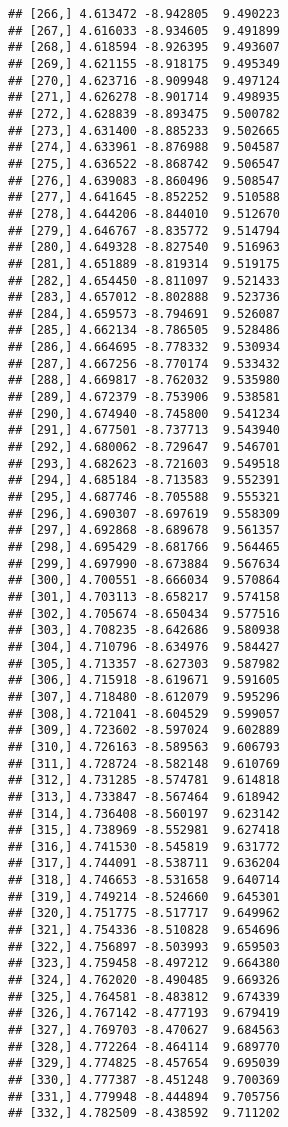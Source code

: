 \documentclass[]{book}
\theoremstyle{definition}
\theoremstyle{definition}
\theoremstyle{definition}
\theoremstyle{remark}
\begin{document}
\begin{verbatim}
## [266,] 4.613472 -8.942805  9.490223
## [267,] 4.616033 -8.934605  9.491899
## [268,] 4.618594 -8.926395  9.493607
## [269,] 4.621155 -8.918175  9.495349
## [270,] 4.623716 -8.909948  9.497124
## [271,] 4.626278 -8.901714  9.498935
## [272,] 4.628839 -8.893475  9.500782
## [273,] 4.631400 -8.885233  9.502665
## [274,] 4.633961 -8.876988  9.504587
## [275,] 4.636522 -8.868742  9.506547
## [276,] 4.639083 -8.860496  9.508547
## [277,] 4.641645 -8.852252  9.510588
## [278,] 4.644206 -8.844010  9.512670
## [279,] 4.646767 -8.835772  9.514794
## [280,] 4.649328 -8.827540  9.516963
## [281,] 4.651889 -8.819314  9.519175
## [282,] 4.654450 -8.811097  9.521433
## [283,] 4.657012 -8.802888  9.523736
## [284,] 4.659573 -8.794691  9.526087
## [285,] 4.662134 -8.786505  9.528486
## [286,] 4.664695 -8.778332  9.530934
## [287,] 4.667256 -8.770174  9.533432
## [288,] 4.669817 -8.762032  9.535980
## [289,] 4.672379 -8.753906  9.538581
## [290,] 4.674940 -8.745800  9.541234
## [291,] 4.677501 -8.737713  9.543940
## [292,] 4.680062 -8.729647  9.546701
## [293,] 4.682623 -8.721603  9.549518
## [294,] 4.685184 -8.713583  9.552391
## [295,] 4.687746 -8.705588  9.555321
## [296,] 4.690307 -8.697619  9.558309
## [297,] 4.692868 -8.689678  9.561357
## [298,] 4.695429 -8.681766  9.564465
## [299,] 4.697990 -8.673884  9.567634
## [300,] 4.700551 -8.666034  9.570864
## [301,] 4.703113 -8.658217  9.574158
## [302,] 4.705674 -8.650434  9.577516
## [303,] 4.708235 -8.642686  9.580938
## [304,] 4.710796 -8.634976  9.584427
## [305,] 4.713357 -8.627303  9.587982
## [306,] 4.715918 -8.619671  9.591605
## [307,] 4.718480 -8.612079  9.595296
## [308,] 4.721041 -8.604529  9.599057
## [309,] 4.723602 -8.597024  9.602889
## [310,] 4.726163 -8.589563  9.606793
## [311,] 4.728724 -8.582148  9.610769
## [312,] 4.731285 -8.574781  9.614818
## [313,] 4.733847 -8.567464  9.618942
## [314,] 4.736408 -8.560197  9.623142
## [315,] 4.738969 -8.552981  9.627418
## [316,] 4.741530 -8.545819  9.631772
## [317,] 4.744091 -8.538711  9.636204
## [318,] 4.746653 -8.531658  9.640714
## [319,] 4.749214 -8.524660  9.645301
## [320,] 4.751775 -8.517717  9.649962
## [321,] 4.754336 -8.510828  9.654696
## [322,] 4.756897 -8.503993  9.659503
## [323,] 4.759458 -8.497212  9.664380
## [324,] 4.762020 -8.490485  9.669326
## [325,] 4.764581 -8.483812  9.674339
## [326,] 4.767142 -8.477193  9.679419
## [327,] 4.769703 -8.470627  9.684563
## [328,] 4.772264 -8.464114  9.689770
## [329,] 4.774825 -8.457654  9.695039
## [330,] 4.777387 -8.451248  9.700369
## [331,] 4.779948 -8.444894  9.705756
## [332,] 4.782509 -8.438592  9.711202

\end{verbatim}
\end{document}
